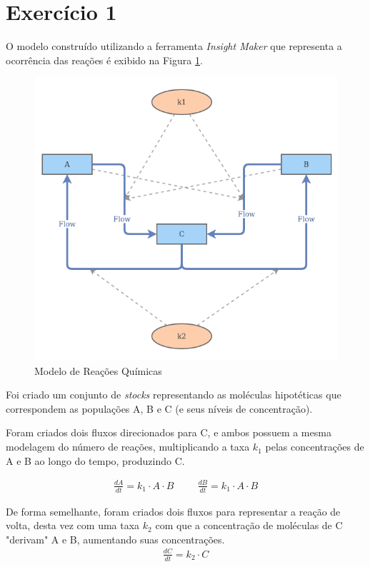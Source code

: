 \documentclass[a4paper, 12pt]{article}
\begin{document}
\section*{Exercício 1}

O modelo construído utilizando a ferramenta \emph{Insight Maker} que representa a ocorrência das reações é exibido na Figura \ref{fig:exampleFig1}.

\begin{figure}[H]
    \centering
    \includegraphics[width=1\textwidth]{Images/Exercise 1/model.png}
    \caption{Modelo de Reações Químicas}
    \label{fig:exampleFig1}
\end{figure}

Foi criado um conjunto de \emph{stocks} representando as moléculas hipotéticas que correspondem as populações A, B e C (e seus níveis de concentração).

Foram criados dois fluxos direcionados para C, e ambos possuem a mesma modelagem do número de reações, multiplicando a taxa \emph{\(k_1\)} pelas concentrações de A e B ao longo do tempo, produzindo C.

\begin{align*}
    \frac{dA}{dt} = k_1 \cdot A \cdot B \hspace{1cm}
    \frac{dB}{dt} = k_1 \cdot A \cdot B
\end{align*}

De forma semelhante, foram criados dois fluxos para representar a reação de volta, desta vez com uma taxa \(k_2\) com que a concentração de moléculas de C "derivam" A e B, aumentando suas concentrações.
\begin{align*}
    \frac{dC}{dt} = k_2 \cdot C
\end{align*}
\end{document}
